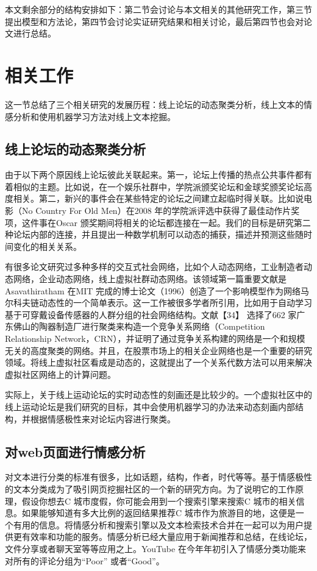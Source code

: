 \documentclass{ctexart}
\begin{document}
        本文剩余部分的结构安排如下：第二节会讨论与本文相关的其他研究工作，第三节提出模型和方法论，第四节会讨论实证研究结果和相关讨论，最后第四节也会对论文进行总结。

    \section{相关工作}
        这一节总结了三个相关研究的发展历程：线上论坛的动态聚类分析，线上文本的情感分析和使用机器学习方法对线上文本挖掘。

        \subsection{线上论坛的动态聚类分析}
            由于以下两个原因线上论坛彼此关联起来。第一，论坛上传播的热点公共事件都有着相似的主题。比如说，在一个娱乐社群中，学院派颁奖论坛和金球奖颁奖论坛高度相关。第二，新兴的事件会在某些特定的论坛之间建立起临时得关联。比如说电影（No Country For Old Men）在2008 年的学院派评选中获得了最佳动作片奖项，这件事在Oscar 颁奖期间将相关的论坛都连接在一起。我们的目标是研究第二种论坛内部的连接，并且提出一种数学机制可以动态的捕获，描述并预测这些随时间变化的相关关系。

            有很多论文研究过多种多样的交互式社会网络，比如个人动态网络，工业制造者动态网络，企业动态网络，线上虚拟社群动态网络。该领域第一篇重要文献是Asavathiratham 在MIT 完成的博士论文（1996）创造了一个影响模型作为网络马尔科夫链动态性的一个简单表示。这一工作被很多学者所引用，比如用于自动学习基于可穿戴设备传感器的人群分组的社会网络结构。文献【34】 选择了662 家广东佛山的陶器制造厂进行聚类来构造一个竞争关系网络（Competition Relationship Network，CRN），并证明了通过竞争关系构建的网络是一个和规模无关的高度聚类的网络。并且，在股票市场上的相关企业网络也是一个重要的研究领域。将线上虚拟社区看成是动态的，这就提出了一个关系代数方法可以用来解决虚拟社区网络上的计算问题。

            实际上，关于线上运动论坛的实时动态性的刻画还是比较少的。一个虚拟社区中的线上运动论坛是我们研究的目标，其中会使用机器学习的办法来动态刻画内部结构，并根据情感极性来对论坛内容进行聚类。

        \subsection{对web页面进行情感分析}
            对文本进行分类的标准有很多，比如话题，结构，作者，时代等等。基于情感极性的文本分类成为了吸引网页挖掘社区的一个新的研究方向。为了说明它的工作原理，假设你想去C 城市度假，你可能会用到一个搜索引擎来搜索C 城市的相关信息。如果能够知道有多大比例的返回结果推荐C 城市作为旅游目的地，这便是一个有用的信息。将情感分析和搜索引擎以及文本检索技术合并在一起可以为用户提供更有效率和功能的服务。情感分析已经大量应用于新闻推荐和总结，在线论坛，文件分享或者聊天室等等应用之上。YouTube 在今年年初引入了情感分类功能来对所有的评论分组为“Poor” 或者“Good”。
\end{document}
